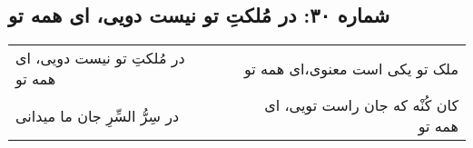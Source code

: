\begin{center}
\section*{شماره ۳۰: در مُلکتِ تو نیست دویی، ای همه تو}
\label{sec:030}
\begin{longtable}{l p{0.5cm} r}
در مُلکتِ تو نیست دویی، ای همه تو
&&
ملک تو یکی است معنوی،‌ای همه تو
\\
در سِرُّ السِّرِ جان ما میدانی
&&
کان کُنْه که جان راست تویی، ای همه تو
\\
\end{longtable}
\end{center}
